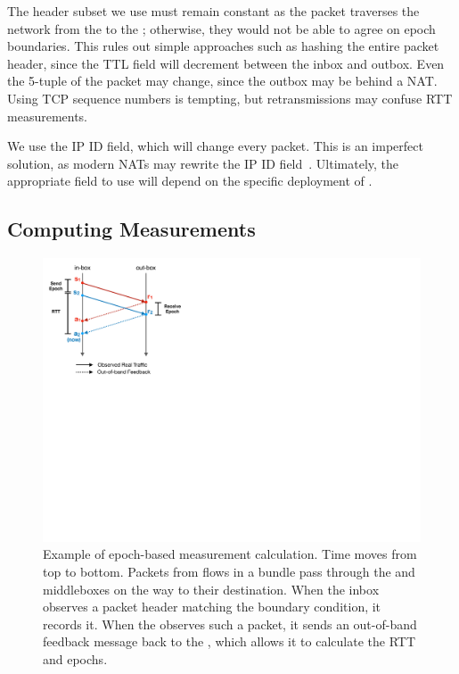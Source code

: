  The header subset we use must remain constant as the packet traverses the network from the \inbox to the \outbox; otherwise, they would not be able to agree on epoch boundaries. This rules out simple approaches such as hashing the entire packet header, since the TTL field will decrement between the inbox and outbox.
Even the 5-tuple of the packet may change, since the outbox may be behind a NAT.
Using TCP sequence numbers is tempting, but retransmissions may confuse RTT measurements.

We use the IP ID field, which will change every packet. This is an imperfect solution, as modern NATs may rewrite the IP ID field~\cite{ipid}.
Ultimately, the appropriate field to use will depend on the specific deployment of \name.

\subsection{Computing Measurements}
\label{s:measure:compute}
\newcommand{\pone}{$p_{prev}$}
\newcommand{\hpone}{$h(p_{prev})$}
\newcommand{\sone}{$s_{prev}$}
\newcommand{\rone}{$r_{prev}$}
\newcommand{\ptwo}{$p_{curr}$}
\newcommand{\hptwo}{$h(p_{curr})$}
\newcommand{\stwo}{$s_{curr}$}
\newcommand{\rtwo}{$r_{curr}$}
\newcommand{\atwo}{$a_{curr}$}
\newcommand{\sentone}{$sent_{prev}$}
\newcommand{\recvdone}{$rcvd_{prev}$}
\newcommand{\senttwo}{$sent_{curr}$}
\newcommand{\recvdtwo}{$rcvd_{curr}$}


\begin{figure}
    \centering
    \includegraphics[width=\columnwidth]{img/rate-calculation}
    \caption{Example of epoch-based measurement calculation. Time moves from top to bottom.
    Packets from flows in a bundle
    pass through the \inbox and \outbox middleboxes on the way to their destination. When 
    the inbox observes a packet header matching the boundary condition, it records it. When
    the \outbox observes such a packet, it sends an out-of-band feedback message back to
    the \inbox, which allows it to calculate the RTT and epochs.}\label{fig:ratecalc}
\end{figure}

